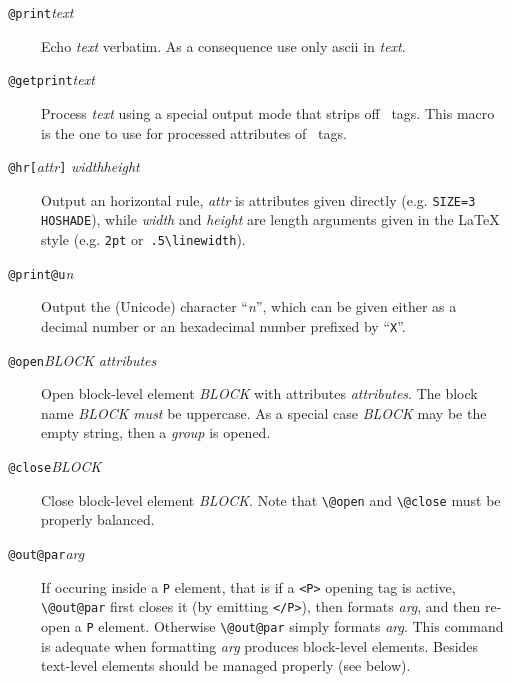 \begin{description}
\item[{\tt{} @print}{\it text}{\tt{}}]
Echo \textit{text} verbatim. As a consequence use only ascii
in \textit{text}.
\item[{\tt{} @getprint}{\it text}{\tt{}}]
Process \textit{text} using a special output mode that strips off
\html~tags. This macro is the one to use for processed attributes of
\html~tags.
\item[{\tt{} @hr[}{\it attr}{\tt]}{\it
width}{\tt{}}{\it height}{\tt{}}]
Output an \html{} horizontal rule, \textit{attr} is attributes given
directly (e.g. \verb+SIZE=3 HOSHADE+), while \textit{width} and
\textit{height} are length arguments given in the \LaTeX{} style
(e.g. \verb+2pt+ or~\verb+.5\linewidth+).
\item[{\tt{} @print@u}{\it n}{\tt{}}]
Output the (Unicode) character ``\textit{n}'', which can
be given either as a decimal number or an hexadecimal number prefixed
by ``\texttt{X}''.

\item[{\tt{} @open}{\it BLOCK}{\tt{}}{\it
attributes}{\tt{}}]
Open \html{} block-level element \textit{BLOCK} with attributes
\textit{attributes}. The block name \textit{BLOCK} \emph{must} be
uppercase.
As a special case \textit{BLOCK} may be the empty string, then a \html{}
\emph{group} is opened.
\item[{\tt{} @close}{\it BLOCK}{\tt{}}]
Close \html{} block-level element \textit{BLOCK}.
Note that \verb+\@open+ and \verb+\@close+ must be properly balanced.
\item[{\tt{} @out@par}{\it arg}{\tt{}}]
If occuring inside a \verb+P+ element,
that is if a \verb+<P>+ opening tag is active,
\verb+\@out@par+  first closes it (by emitting \verb+</P>+),
then formats \textit{arg}, and then re-open a \verb+P+ element.
Otherwise \verb+\@out@par+ simply formats \textit{arg}.
This command is adequate when
formatting \textit{arg} produces block-level elements.
Besides text-level elements should be managed properly (see below).
\end{description}

